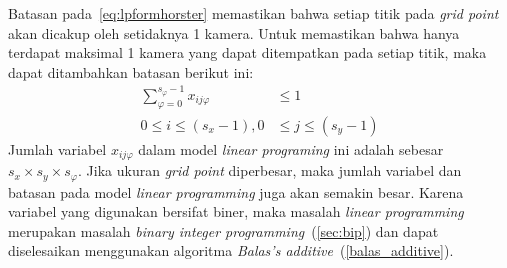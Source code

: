 Batasan pada~\ref{eq:lpformhorster} memastikan bahwa setiap titik pada \textit{grid point} akan dicakup oleh setidaknya 1 kamera. Untuk memastikan bahwa hanya terdapat maksimal 1 kamera yang dapat ditempatkan pada setiap titik, maka dapat ditambahkan batasan berikut ini:
\begin{equation}
	\begin{split}
		\sum_{\varphi=0}^{s_\varphi-1}x_{ij\varphi}&\leq 1\\
		0\leq i\leq(s_x-1), 0&\leq j\leq(s_y-1)
	\end{split}
\end{equation}
Jumlah variabel \(x_{ij\varphi}\) dalam model \textit{linear programing} ini adalah sebesar \(s_x\times s_y\times s_\varphi\). Jika ukuran \textit{grid point} diperbesar, maka jumlah variabel dan batasan pada model \textit{linear programming} juga akan semakin besar. Karena variabel yang digunakan bersifat biner, maka masalah \textit{linear programming} merupakan masalah \textit{binary integer programming}~(\ref{sec:bip}) dan dapat diselesaikan menggunakan algoritma \textit{Balas's additive}~(\ref{balas_additive}).